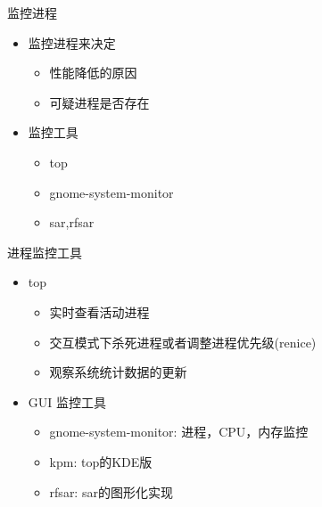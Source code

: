  \begin{frame}{监控进程}
\begin{itemize}
\item 监控进程来决定

\begin{itemize}
\item 性能降低的原因
\item 可疑进程是否存在
\end{itemize}
\item 监控工具

\begin{itemize}
\item top
\item gnome-system-monitor
\item sar,rfsar
\end{itemize}
\end{itemize}

\end{frame} 
 \begin{frame}{进程监控工具}
\begin{itemize}
\item top

\begin{itemize}
\item 实时查看活动进程
\item 交互模式下杀死进程或者调整进程优先级(renice)
\item 观察系统统计数据的更新
\end{itemize}
\item GUI 监控工具

\begin{itemize}
\item gnome-system-monitor: 进程，CPU，内存监控
\item kpm: top的KDE版
\item rfsar: sar的图形化实现
\end{itemize}
\end{itemize}

\end{frame} 

%
%
%
%

